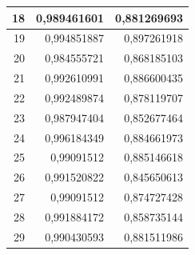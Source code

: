 \documentclass{beamer}
\begin{document}
\begin{frame}
\begin{table}[htbp]
\begin{tabular}{|rrr|}
    \midrule
    \rowcolor[rgb]{ .886,  .937,  .855} 18    & 0,989461601 & 0,881269693 \\
    \midrule
    19    & 0,994851887 & 0,897261918 \\
    \midrule
    \rowcolor[rgb]{ .886,  .937,  .855} 20    & 0,984555721 & 0,868185103 \\
    \midrule
    21    & 0,992610991 & 0,886600435 \\
    \midrule
    \rowcolor[rgb]{ .886,  .937,  .855} 22    & 0,992489874 & 0,878119707 \\
    \midrule
    23    & 0,987947404 & 0,852677464 \\
    \midrule
    \rowcolor[rgb]{ .886,  .937,  .855} 24    & 0,996184349 & 0,884661973 \\
    \midrule
    25    & 0,99091512 & 0,885146618 \\
    \midrule
    \rowcolor[rgb]{ .886,  .937,  .855} 26    & 0,991520822 & 0,845650613 \\
    \midrule
    27    & 0,99091512 & 0,874727428 \\
    \midrule
    \rowcolor[rgb]{ .886,  .937,  .855} 28    & 0,991884172 & 0,858735144 \\
    \midrule
    29    & 0,990430593 & 0,881511986 \\
    \bottomrule
    \end{tabular}
  \label{tab:addlabel}
\end{table}
\end{frame}
\end{document}
